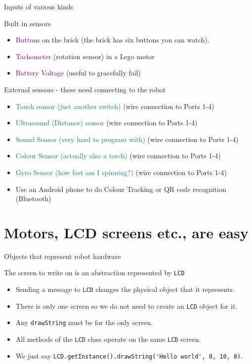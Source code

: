 \documentclass[color=pdftex,usenames,dvipsnames, aspectratio=169]{beamer}
\begin{document}
\begin{frame}{Inputs of various kinds}
\begin{block}{Built in sensors}
\begin{itemize}
\item \textcolor{purple}{Buttons} on the brick (the brick has six buttons you can watch).
\item \textcolor{purple}{Tachometer} (rotation sensor) in a Lego motor
\item \textcolor{purple}{Battery Voltage} (useful to gracefully fail)
\end{itemize}
\end{block}

\begin{block}{External sensors - these need connecting to the robot}
\begin{itemize}
\item \textcolor{teal}{Touch sensor (just another switch)} (wire connection to Ports 1-4)
\item \textcolor{teal}{Ultrasound (Distance) sensor} (wire connection to Ports 1-4)
\item \textcolor{teal}{Sound Sensor (very hard to program with)} (wire connection to Ports 1-4)
\item \textcolor{teal}{Colour Sensor (actually also a torch)} (wire connection to Ports 1-4)
\item \textcolor{teal}{Gyro Sensor (how fast am I spinning?)} (wire connection to Ports 1-4)
\item \textcolor{RedOrange}{Use an Android phone to do Colour Tracking or QR code recognition} (Bluetooth)
\end{itemize}
\end{block}

\end{frame}

\section{Motors, LCD screens etc., are easy}
\begin{frame}{Objects that represent robot hardware}
\begin{block}{The screen to write on is an abstraction represented by \lstinline[identifierstyle=\color{yellow}]!LCD!}
\begin{itemize}
\item Sending a message to \lstinline!LCD! changes the physical object that it represents.
\item There is \alert{only one screen} so we do not need to create an \lstinline!LCD! object for it.
\item Any \lstinline!drawString! must be for the only screen.
\item All methods of the \lstinline!LCD! class operate on the same \lstinline!LCD! screen.  
\item We just say \lstinline!LCD.getInstance().drawString('Hello world', 0, 10, 0)!.
\end{itemize}
\end{block}
\end{frame}
\end{document}
